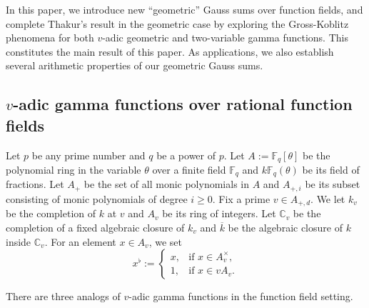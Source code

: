 \documentclass[11pt]{amsart}
\theoremstyle{plain}
\theoremstyle{definition}
\theoremstyle{remark}
\numberwithin{equation}{section}
\newcommand{\CC}{\mathbb{C}}
\newcommand{\FF}{\mathbb{F}}
\newcommand{\ovl}{\overline}
\newcommand{\Fq}{\FF_q}
\newcommand{\T}{\theta}
\newcommand{\Ami}{A_{+,i}}
\begin{document}
	In this paper, we introduce new “geometric” Gauss sums over function fields, and complete Thakur’s result in the geometric case by exploring the Gross-Koblitz phenomena for both $v$-adic geometric and two-variable gamma functions.
	This constitutes the main result of this paper.
	As applications, we also establish several arithmetic properties of our geometric Gauss sums.
	
	\subsection{\texorpdfstring{$v$}{v}-adic gamma functions over rational function fields}
	
	Let $p$ be any prime number and $q$ be a power of $p$.
	Let $A:=\Fq[\T]$ be the polynomial ring in the variable $\T$ over a finite field $\Fq$ and $k\Fq(\T)$ be its field of fractions.
	Let $A_+$ be the set of all monic polynomials in $A$ and $\Ami$ be its subset consisting of monic polynomials of degree $i \geq 0$.
	Fix a prime $v\in A_{+,d}$.
	We let $k_v$ be the completion of $k$ at $v$ and $A_v$ be its ring of integers.
	Let $\CC_v$ be the completion of a fixed algebraic closure of $k_v$ and $\ovl{k}$ be the algebraic closure of $k$ inside $\CC_v$. 
	For an element $x\in A_v$, we set
	$$
	x^\flat := 
	\begin{cases}
		x, & \text{if } x \in A_v^\times, \\
		1, & \text{if } x\in v A_v.
	\end{cases}
	$$
	
	There are three analogs of $v$-adic gamma functions in the function field setting.
	
\end{document}

